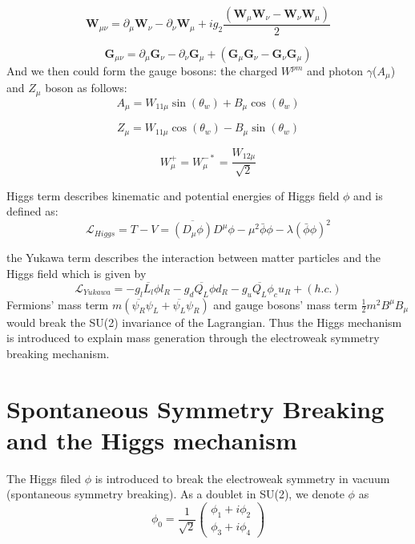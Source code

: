 \begin{equation*}
	\mathbf{W}_{\mu\nu}=\partial_\mu\mathbf{W}_\nu-\partial_\nu\mathbf{W}_\mu+ig_2\frac{\left(\mathbf{W}_\mu\mathbf{W}_\nu-\mathbf{W}_\nu\mathbf{W}_\mu\right)}{2}
\end{equation*}

\begin{equation*}
	\mathbf{G}_{\mu\nu}=\partial_\mu\mathbf{G}_\nu-\partial_\nu\mathbf{G}_\mu+\left(\mathbf{G}_\mu\mathbf{G}_\nu-\mathbf{G}_\nu\mathbf{G}_\mu\right)
\end{equation*}
And we then could form the gauge bosons: the charged $W^{pm}$ and photon $\gamma$($A_\mu$) and $Z_\mu$ boson as follows:
\begin{equation*}
	A_\mu=W_{11\mu}\sin\left(\theta_w\right)+B_\mu\cos\left(\theta_w\right)
\end{equation*}

\begin{equation*}
	Z_\mu=W_{11\mu}\cos\left(\theta_w\right)-B_\mu\sin\left(\theta_w\right)
\end{equation*}

\begin{equation*}
	W_\mu^+=W_\mu^{-*}=\frac{W_{12\mu}}{\sqrt{2}}
\end{equation*}

Higgs term describes kinematic and potential energies of Higgs field $\phi$ and is defined as:
\begin{equation}
    \mathcal{L}_{Higgs}= T-V =\overline{\left(D_\mu\phi\right)}D^\mu\phi-\mu^2\bar{\phi}\phi-\lambda(\bar{\phi}\phi)^2
    \label{eq:higgs}
\end{equation}

the Yukawa term describes the interaction between matter particles and the Higgs field which is given by
\begin{equation}
    \mathcal{L}_{Yukawa} = - g_l \overline{L_l}\phi l_R - g_d\overline{Q_L}\phi d_R -  g_u\overline{Q_L}\phi_c u_R + (h.c.)
    \label{eq:yukawa}
\end{equation}
Fermions' mass term $m(\overline{\psi_R}\psi_L+\overline{\psi_L}\psi_R)$ and gauge bosons' mass term $\frac{1}{2}m^2 B^\mu B_\mu$
 would break the SU(2) 
invariance of the Lagrangian. Thus the Higgs mechanism is
introduced to explain mass generation through the electroweak symmetry breaking
mechanism.
\section{Spontaneous Symmetry Breaking and the Higgs mechanism}
The Higgs filed $\phi$ is introduced to break the electroweak symmetry in vacuum (spontaneous symmetry breaking).
As a doublet in SU(2), we denote $\phi$ as
\begin{equation}
    \phi_0=\frac{1}{\sqrt{2}}\left( \begin{smallmatrix} \phi_1+i\phi_2\\ \phi_3+i\phi_4 \end{smallmatrix}\right)
          \label{eq:higgsfiled}
\end{equation}

